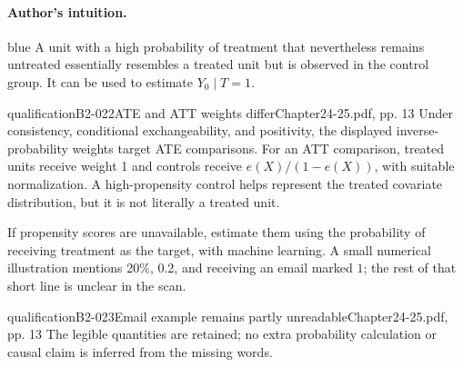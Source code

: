 \paragraph{Author's intuition.}
\begin{inkblock}{blue}
A unit with a high probability of treatment that nevertheless remains untreated essentially resembles a treated unit but is observed in the control group. It can be used to estimate \(Y_0\mid T=1\).
\end{inkblock}\begin{reviewnote}{qualification}{B2-022}{ATE and ATT weights differ}{Chapter24-25.pdf, pp. 13}
Under consistency, conditional exchangeability, and positivity, the displayed inverse-probability weights target ATE comparisons. For an ATT comparison, treated units receive weight 1 and controls receive \(e(X)/(1-e(X))\), with suitable normalization. A high-propensity control helps represent the treated covariate distribution, but it is not literally a treated unit.
\par{}
\end{reviewnote}

If propensity scores are unavailable, estimate them using the probability of receiving treatment as the target, with machine learning. A small numerical illustration mentions 20\%, 0.2, and receiving an email marked \(1\); the rest of that short line is unclear in the scan.
\begin{reviewnote}{qualification}{B2-023}{Email example remains partly unreadable}{Chapter24-25.pdf, pp. 13}
The legible quantities are retained; no extra probability calculation or causal claim is inferred from the missing words.
\end{reviewnote}


